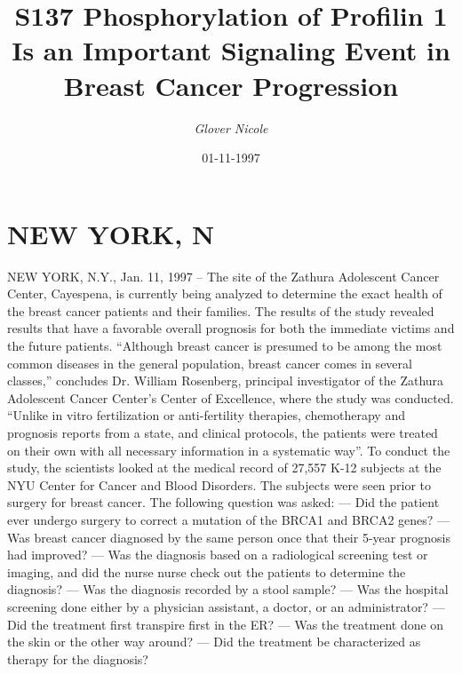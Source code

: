 \documentclass{article}%
\title{S137 Phosphorylation of Profilin 1 Is an Important Signaling Event in Breast Cancer Progression}%
\author{\textit{Glover Nicole}}%
\date{01-11-1997}%
\begin{document}
%
\normalsize%
\maketitle%
\section{NEW YORK, N}%
\label{sec:NEWYORK,N}%
NEW YORK, N.Y., Jan. 11, 1997 – The site of the Zathura Adolescent Cancer Center, Cayespena, is currently being analyzed to determine the exact health of the breast cancer patients and their families. The results of the study revealed results that have a favorable overall prognosis for both the immediate victims and the future patients. “Although breast cancer is presumed to be among the most common diseases in the general population, breast cancer comes in several classes,” concludes Dr. William Rosenberg, principal investigator of the Zathura Adolescent Cancer Center’s Center of Excellence, where the study was conducted. “Unlike in vitro fertilization or anti{-}fertility therapies, chemotherapy and prognosis reports from a state, and clinical protocols, the patients were treated on their own with all necessary information in a systematic way”.\newline%
To conduct the study, the scientists looked at the medical record of 27,557 K{-}12 subjects at the NYU Center for Cancer and Blood Disorders. The subjects were seen prior to surgery for breast cancer. The following question was asked:\newline%
— Did the patient ever undergo surgery to correct a mutation of the BRCA1 and BRCA2 genes?\newline%
— Was breast cancer diagnosed by the same person once that their 5{-}year prognosis had improved?\newline%
— Was the diagnosis based on a radiological screening test or imaging, and did the nurse nurse check out the patients to determine the diagnosis?\newline%
— Was the diagnosis recorded by a stool sample?\newline%
— Was the hospital screening done either by a physician assistant, a doctor, or an administrator?\newline%
— Did the treatment first transpire first in the ER?\newline%
— Was the treatment done on the skin or the other way around?\newline%
— Did the treatment be characterized as therapy for the diagnosis?\newline%
\end{document}
